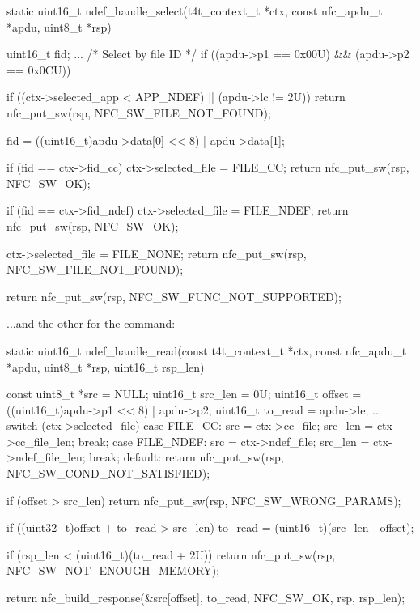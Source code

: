 \begtt
static uint16_t ndef_handle_select(t4t_context_t *ctx, 
                                   const nfc_apdu_t *apdu, 
                                   uint8_t *rsp)
{
    uint16_t fid;
    ...
    /* Select by file ID */
    if ((apdu->p1 == 0x00U) && (apdu->p2 == 0x0CU))
    {
        if ((ctx->selected_app < APP_NDEF) || (apdu->lc != 2U))
        {
            return nfc_put_sw(rsp, NFC_SW_FILE_NOT_FOUND);
        }

        fid = ((uint16_t)apdu->data[0] << 8) | apdu->data[1];

        if (fid == ctx->fid_cc)
        {
            ctx->selected_file = FILE_CC;
            return nfc_put_sw(rsp, NFC_SW_OK);
        }

        if (fid == ctx->fid_ndef)
        {
            ctx->selected_file = FILE_NDEF;
            return nfc_put_sw(rsp, NFC_SW_OK);
        }

        ctx->selected_file = FILE_NONE;
        return nfc_put_sw(rsp, NFC_SW_FILE_NOT_FOUND);
    }
    return nfc_put_sw(rsp, NFC_SW_FUNC_NOT_SUPPORTED);
}
\endtt
...and the other for the  command:

\begtt
static uint16_t ndef_handle_read(const t4t_context_t *ctx, 
                                 const nfc_apdu_t *apdu, 
                                 uint8_t *rsp, 
                                 uint16_t rsp_len)
{
    const uint8_t *src = NULL;
    uint16_t src_len = 0U;
    uint16_t offset = ((uint16_t)apdu->p1 << 8) | apdu->p2;
    uint16_t to_read = apdu->le;
    ...
    switch (ctx->selected_file) {
    case FILE_CC:
        src     = ctx->cc_file;
        src_len = ctx->cc_file_len;
        break;
    case FILE_NDEF:
        src     = ctx->ndef_file;
        src_len = ctx->ndef_file_len;
        break;
    default:
        return nfc_put_sw(rsp, NFC_SW_COND_NOT_SATISFIED);
    }

    if (offset > src_len)
    {
        return nfc_put_sw(rsp, NFC_SW_WRONG_PARAMS);
    }

    if ((uint32_t)offset + to_read > src_len)
    {
        to_read = (uint16_t)(src_len - offset);
    }

    if (rsp_len < (uint16_t)(to_read + 2U))
    {
        return nfc_put_sw(rsp, NFC_SW_NOT_ENOUGH_MEMORY);
    }

    return nfc_build_response(&src[offset], 
                              to_read, 
                              NFC_SW_OK, 
                              rsp, 
                              rsp_len);
}
\endtt
